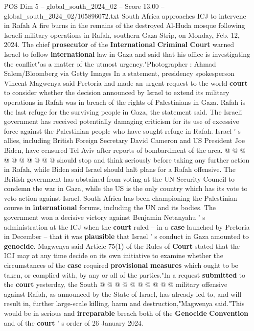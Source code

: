 \begin{textsample}{POS Dim 5 – global\_south\_2024\_02 – Score 13.00 – global\_south\_2024\_02/105896072.txt}  \label{ex:f5_pos_198}
South Africa approaches ICJ to intervene in Rafah A fire burns in the remains of the destroyed Al-Huda mosque following Israeli military operations in Rafah, southern Gaza Strip, on Monday, Feb. 12, 2024.
The chief \textbf{prosecutor} of the \textbf{International} \textbf{Criminal} \textbf{Court} warned Israel to follow \textbf{international} law in Gaza and said that his office is investigating the conflict"as a matter of the utmost urgency."Photographer : Ahmad Salem/Bloomberg via Getty Images In a statement, presidency spokesperson Vincent Magwenya said Pretoria had made an urgent request to the world \textbf{court} to consider whether the decision announced by Israel to extend its military operations in Rafah was in breach of the rights of Palestinians in Gaza.
Rafah is the last refuge for the surviving people in Gaza, the statement said.
The Israeli government has received potentially damaging criticism for its use of excessive force against the Palestinian people who have sought refuge in Rafah.
Israel ' s allies, including British Foreign Secretary David Cameron and US President Joe Biden, have censured Tel Aviv after reports of bombardment of the area. @ @ @ @ @ @ @ @ @ @ should stop and think seriously before taking any further action in Rafah, while Biden said Israel should halt plans for a Rafah offensive.
The British government has abstained from voting at the UN Security Council to condemn the war in Gaza, while the US is the only country which has its vote to veto action against Israel.
South Africa has been championing the Palestinian course in \textbf{international} forums, including the UN and its bodies.
The government won a decisive victory against Benjamin Netanyahu ' s administration at the ICJ when the \textbf{court} ruled -- in a \textbf{case} launched by Pretoria in December -- that it was \textbf{plausible} that Israel ' s conduct in Gaza amounted to \textbf{genocide}.
Magwenya said Article 75(1) of the Rules of \textbf{Court} stated that the ICJ may at any time decide on its own initiative to examine whether the circumstances of the \textbf{case} required \textbf{provisional} \textbf{measures} which ought to be taken, or complied with, by any or all of the parties."In a request \textbf{submitted} to the \textbf{court} yesterday, the South @ @ @ @ @ @ @ @ @ @ military offensive against Rafah, as announced by the State of Israel, has already led to, and will result in, further large-scale killing, harm and destruction,"Magwenya said."This would be in serious and \textbf{irreparable} breach both of the \textbf{Genocide} \textbf{Convention} and of the \textbf{court} ' s order of 26 January 2024.

\end{textsample}
